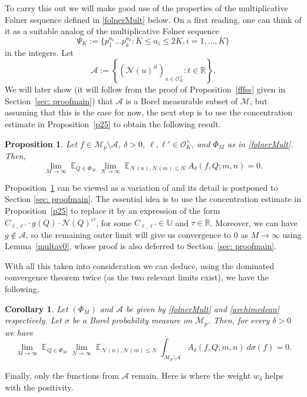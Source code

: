 \documentclass[11pt]{amsart}
\newtheorem{corollary}[lemma]{Corollary}
\newtheorem{proposition}[lemma]{Proposition}
\theoremstyle{definition}
\DeclareMathOperator*{\E}{\mathbb{E}}
\newcommand{\NN}{{\mathcal N}}
\newcommand{\R}{{\mathbb R}}
\newcommand{\U}{{\mathbb U}}
\begin{document}
To carry this out we will make good use of the properties of the multiplicative F\o lner sequence defined in \eqref{folnerMult} below. On a first reading, one can think of it as a suitable analog of the multiplicative F\o lner sequence
\[
\Psi_K:=\{ p_1^{a_1}\dots p_k^{a_k} : K \leq a_i \leq 2K, i=1,\dots,K\}
\]
in the integers.
Let
\begin{equation}\label{archimedean}
\mathcal{A}:= \left\{ (\NN(u)^{it})_{u \in \mathcal{O}_K^{\times}} : t \in \R\right\}.
\end{equation}
We will later show (it will follow from the proof of Proposition~\ref{fffss} given in Section~\ref{sec: proofmain}) that $\mathcal{A}$ is a Borel measurable subset of $\mathcal{M}$, but assuming that this is the case for now, the next step is to use the concentration estimate in Proposition~\ref{p25} to obtain the following result.

 
\begin{proposition}\label{zeroaveragesadeltabdelta}
Let $f \in \mathcal{M}_p \setminus \mathcal{A}$, $\delta>0$, $\ell,\ell' \in \mathcal{O}_K^{\times}$, and $\Phi_M$ as in \eqref{folnerMult}. Then,
\[
\lim_{M \to \infty} \E_{Q \in \Phi_M} \lim_{N \to \infty} \E_{\NN(n),\NN(m) \leq N} A_{\delta}(f,Q; m,n)=0.
\]
\end{proposition}
Proposition~\ref{zeroaveragesadeltabdelta} can be viewed as a variation of \cite[Lemma~2.6]{FKM1} 
and its detail is postponed to Section \ref{sec: proofmain}. The essential idea is to use the concentration estimate in Proposition~\ref{p25} to replace it by an expression of the form $C_{\ell,\ell'}\cdot g(Q)\cdot \NN(Q)^{i\tau}$, for some $C_{\ell,\ell'} \in \U$ and $\tau \in \R$. Moreover, we can have $g \notin \mathcal{A}$, so the remaining outer limit will give us convergence to $0$ as $M \to \infty$ using Lemma~\ref{multav0}, whose proof is also deferred to Section~\ref{sec: proofmain}.

With all this taken into consideration we can deduce, using the dominated convergence theorem twice (as the two relevant limits exist), we have the following.

\begin{corollary}
Let $(\Phi_M)$ and $\mathcal{A}$ be given by \eqref{folnerMult} and \eqref{archimedean} respectively. Let $\sigma$ be a Borel probability measure on $\mathcal{M}_p$. Then, for every $\delta>0$ we have
\[
\lim_{M \to \infty} \E_{Q \in \Phi_M} \lim_{N \to \infty} \E_{\NN(n),\NN(m) \leq N} \int_{\mathcal{M}_p \setminus \mathcal{A}} A_{\delta}(f,Q; m,n) \ d\sigma(f)=0. 
\]
\end{corollary}
Finally, only the functions from $\mathcal{A}$ remain. Here is where the weight $w_{\delta}$ helps with the positivity.
\end{document}
